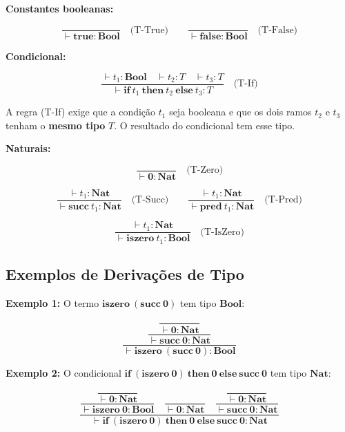 \textbf{Constantes booleanas:}

\[
  \frac{}{\vdash \mathbf{true} : \mathbf{Bool}} \quad\text{(T-True)}
  \qquad
  \frac{}{\vdash \mathbf{false} : \mathbf{Bool}} \quad\text{(T-False)}
\]

\textbf{Condicional:}

\[
  \frac{
    \vdash t_1 : \mathbf{Bool} \quad
    \vdash t_2 : T \quad
    \vdash t_3 : T
  }{
    \vdash \mathbf{if}\ t_1\ \mathbf{then}\ t_2\ \mathbf{else}\ t_3 : T
  } \quad\text{(T-If)}
\]

A regra (T-If) exige que a condição \(t_1\) seja booleana e que os
dois ramos \(t_2\) e \(t_3\) tenham o \textbf{mesmo tipo} \(T\). O
resultado do condicional tem esse tipo.

\textbf{Naturais:}

\[
  \frac{}{\vdash \mathbf{0} : \mathbf{Nat}} \quad\text{(T-Zero)}
\]

\[
  \frac{\vdash t_1 : \mathbf{Nat}}{\vdash \mathbf{succ}\ t_1 :
  \mathbf{Nat}} \quad\text{(T-Succ)}
  \qquad
  \frac{\vdash t_1 : \mathbf{Nat}}{\vdash \mathbf{pred}\ t_1 :
  \mathbf{Nat}} \quad\text{(T-Pred)}
\]

\[
  \frac{\vdash t_1 : \mathbf{Nat}}{\vdash \mathbf{iszero}\ t_1 :
  \mathbf{Bool}} \quad\text{(T-IsZero)}
\]

\subsection{Exemplos de Derivações de Tipo}

\textbf{Exemplo 1:} O termo
\(\mathbf{iszero}\ (\mathbf{succ}\ \mathbf{0})\) tem tipo \(\mathbf{Bool}\):

\[
  \dfrac{
    \dfrac{
      \dfrac{}{\vdash \mathbf{0} : \mathbf{Nat}}
    }{\vdash \mathbf{succ}\ \mathbf{0} : \mathbf{Nat}}
  }{\vdash \mathbf{iszero}\ (\mathbf{succ}\ \mathbf{0}) : \mathbf{Bool}}
\]

\textbf{Exemplo 2:} O condicional
\(\mathbf{if}\ (\mathbf{iszero}\ \mathbf{0})\ \mathbf{then}\ \mathbf{0}\ \mathbf{else}\ \mathbf{succ}\ \mathbf{0}\)
tem tipo \(\mathbf{Nat}\):

\[
  \dfrac{
    \dfrac{
      \dfrac{}{\vdash \mathbf{0} : \mathbf{Nat}}
    }{\vdash \mathbf{iszero}\ \mathbf{0} : \mathbf{Bool}}
    \quad
    \dfrac{}{\vdash \mathbf{0} : \mathbf{Nat}}
    \quad
    \dfrac{
      \dfrac{}{\vdash \mathbf{0} : \mathbf{Nat}}
    }{\vdash \mathbf{succ}\ \mathbf{0} : \mathbf{Nat}}
  }{\vdash
    \mathbf{if}\ (\mathbf{iszero}\ \mathbf{0})\ \mathbf{then}\ \mathbf{0}\ \mathbf{else}\ \mathbf{succ}\ \mathbf{0}
  : \mathbf{Nat}}
\]

